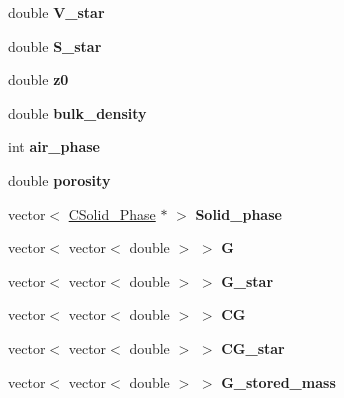 \begin{DoxyCompactItemize}
double {\bfseries V\+\_\+star}
\item 
\mbox{\label{class_c_m_b_block_a80fef5934c376be1168d97f64da8e3ce}} 
double {\bfseries S\+\_\+star}
\item 
\mbox{\label{class_c_m_b_block_a42d1cb1c4ab6bdc451f737221951dd79}} 
double {\bfseries z0}
\item 
\mbox{\label{class_c_m_b_block_a57e187fae7f1d31e0d689c26c6f913f2}} 
double {\bfseries bulk\+\_\+density}
\item 
\mbox{\label{class_c_m_b_block_a9bb65678620afc2461dfff9fc13e9183}} 
int {\bfseries air\+\_\+phase}
\item 
\mbox{\label{class_c_m_b_block_a4b83a7fc4fae0c9fb8cf524e8954d818}} 
double {\bfseries porosity}
\item 
\mbox{\label{class_c_m_b_block_a06a233edab44e622351d328617ec73b5}} 
vector$<$ \hyperlink{class_c_solid___phase}{C\+Solid\+\_\+\+Phase} $\ast$ $>$ {\bfseries Solid\+\_\+phase}
\item 
\mbox{\label{class_c_m_b_block_a2a27e49282ec0b98d73d86b8b84c017d}} 
vector$<$ vector$<$ double $>$ $>$ {\bfseries G}
\item 
\mbox{\label{class_c_m_b_block_ac0d9a5304733353469ebeda583adebd8}} 
vector$<$ vector$<$ double $>$ $>$ {\bfseries G\+\_\+star}
\item 
\mbox{\label{class_c_m_b_block_a33ffd0e0c489885c3346e441387cbed1}} 
vector$<$ vector$<$ double $>$ $>$ {\bfseries CG}
\item 
\mbox{\label{class_c_m_b_block_a9dbcb76f485a974dc3a7bf069c2d1cb8}} 
vector$<$ vector$<$ double $>$ $>$ {\bfseries C\+G\+\_\+star}
\item 
\mbox{\label{class_c_m_b_block_a5c640428906732b96c323666bfb2a839}} 
vector$<$ vector$<$ double $>$ $>$ {\bfseries G\+\_\+stored\+\_\+mass}
\item 

\end{DoxyCompactItemize}
